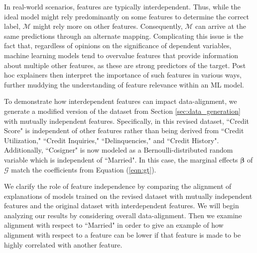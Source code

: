 \documentclass[12pt]{article}  %
\begin{document}
        In real-world scenarios, features are typically interdependent. Thus, while the ideal model might rely predominantly on some features to determine the correct label, $\mathcal{M}$ might rely more on other features. Consequently, $\mathcal{M}$ can arrive at the same predictions through an alternate mapping. Complicating this issue is the fact that, regardless of opinions on the significance of dependent variables, machine learning models tend to overvalue features that provide information about multiple other features, as these are strong predictors of the target. Post hoc explainers then interpret the importance of such features in various ways, further muddying the understanding of feature relevance within an ML model.

         To demonstrate how interdependent features can impact data-alignment, we generate a modified version of the dataset from Section \ref{sec:data_generation} with mutually independent features. Specifically, in this revised dataset, ``Credit Score" is independent of other features rather than being derived from ``Credit Utilization," ``Credit Inquiries," ``Delinquencies," and ``Credit History". Additionally, ``Cosigner"  is now modeled as a Bernoulli-distributed random variable which is independent of ``Married". In this case, the marginal effects $\boldsymbol{\beta}$ of $\mathcal{G}$ match the coefficients from Equation (\ref{eqn:gt}). %
        

        We clarify the role of feature independence by comparing the alignment of explanations of models trained on the revised dataset with mutually independent features and the original dataset with interdependent features. We will begin analyzing our results by considering overall data-alignment. Then we examine alignment with respect to ``Married" in order to give an example of how alignment with respect to a feature can be lower if that feature is made to be highly correlated with another feature.
        
\end{document}
